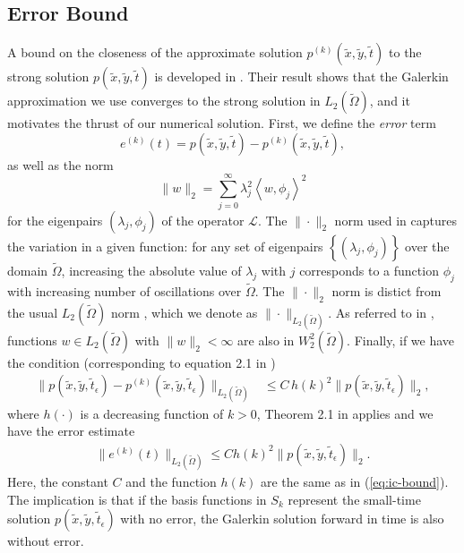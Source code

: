 \subsection{Error Bound} \label{sec:error-bound}
A bound on the closeness of the approximate solution $p^{(k)}(\tilde{x},\tilde{y},\tilde{t})$
to the strong solution $p(\tilde{x},\tilde{y},\tilde{t})$ is developed in
\cite{bramble1977some}.  Their result shows that the Galerkin
approximation we use converges to the strong solution in
$L_2(\tilde{\Omega})$, and it motivates the thrust of our numerical
solution. First, we define the \textit{error} term
\[
  e^{(k)}(t) = p(\tilde{x},\tilde{y},\tilde{t}) -
  p^{(k)}(\tilde{x},\tilde{y},\tilde{t}),
\]
as well as the norm
\[
  \| w \|_2 = \sum_{j=0}^\infty \lambda_j^2 \left<w, \phi_j\right>^2
\]
for the eigenpairs $(\lambda_j, \phi_j)$ of the operator
$\mathcal{L}$. The $\| \cdot \|_2$ norm used in \cite{bramble1977some}
captures the variation in a given function: for any set of eigenpairs
$\left\{(\lambda_j, \phi_j)\right\}$ over the domain $\tilde{\Omega}$,
increasing the absolute value of $\lambda_j$ with $j$ corresponds to a
function $\phi_j$ with increasing number of oscillations over
$\tilde{\Omega}$. The $\|\cdot\|_2$ norm is distict from the usual
$L_2(\tilde{\Omega})$ norm , which we denote as
$\|\cdot \|_{L_2(\tilde{\Omega})}$. As referred to in
\cite{bramble1977some}, functions $w \in L_2(\tilde{\Omega})$ with
$\|w\|_2 < \infty$ are also in $W_2^2(\tilde{\Omega})$. Finally, if we
have the condition (corresponding to equation 2.1 in
\cite{bramble1977some})
\begin{align}
  \| p(\tilde{x},\tilde{y},\tilde{t}_\epsilon) - p^{(k)}(\tilde{x},\tilde{y},\tilde{t}_\epsilon) \|_{L_2(\tilde{\Omega})} &\leq C\, h(k)^2 \| p(\tilde{x},\tilde{y},\tilde{t}_\epsilon) \|_2, \label{eq:ic-bound}
\end{align}
where $h(\cdot)$ is a decreasing function of $k > 0$, Theorem 2.1 in
\cite{bramble1977some} applies and we have the error estimate
\begin{align}
  \| e^{(k)}(t) \|_{L_2(\tilde{\Omega})} \leq C h(k)^2 \| p(\tilde{x},\tilde{y},\tilde{t}_\epsilon) \|_{2}. \label{eq:error-est}
\end{align}
Here, the  constant $C$  and the  function $h(k)$ are  the same  as in
(\ref{eq:ic-bound}). The implication is that if the basis functions in
$S_k$ represent  the small-time  solution $p(\tilde{x},\tilde{y},\tilde{t}_\epsilon)$  with no
error, the Galerkin solution forward in time is also without error.

